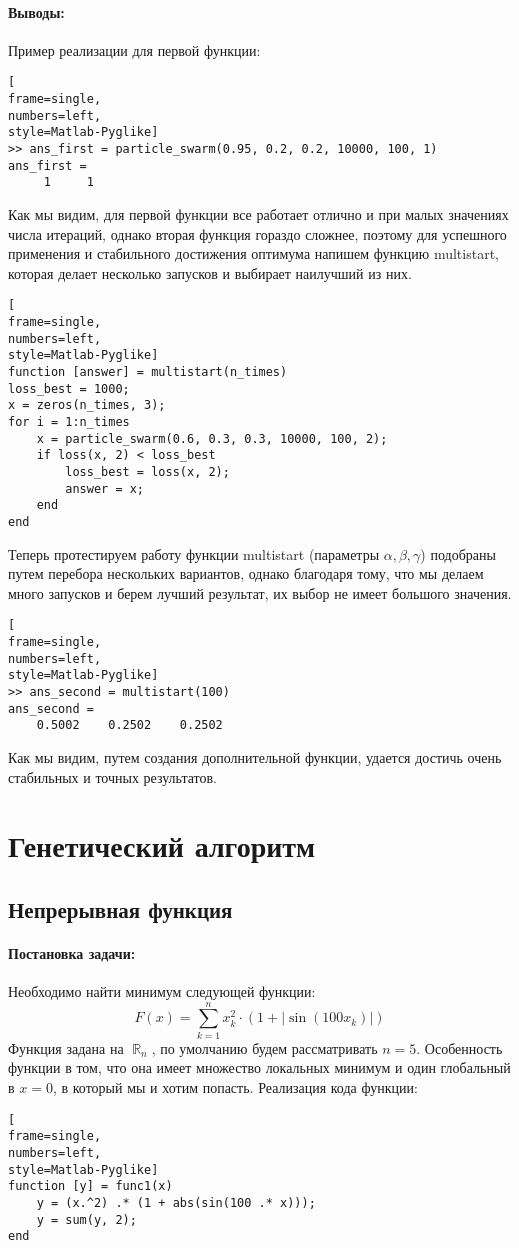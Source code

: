 \documentclass[12pt]{article}
\DeclareMathOperator{\R}{\mathbb{R}}
\begin{document}
\paragraph{Выводы:}
Пример реализации для первой функции:
\begin{lstlisting}[
frame=single,
numbers=left,
style=Matlab-Pyglike]
>> ans_first = particle_swarm(0.95, 0.2, 0.2, 10000, 100, 1)
ans_first =
     1     1
\end{lstlisting}
Как мы видим, для первой функции все работает отлично и при малых значениях числа итераций, однако вторая функция гораздо сложнее, поэтому для успешного применения и стабильного достижения оптимума напишем функцию multistart, которая делает несколько запусков и выбирает наилучший из них. 
\begin{lstlisting}[
frame=single,
numbers=left,
style=Matlab-Pyglike]
function [answer] = multistart(n_times)
loss_best = 1000;
x = zeros(n_times, 3);
for i = 1:n_times
    x = particle_swarm(0.6, 0.3, 0.3, 10000, 100, 2);
    if loss(x, 2) < loss_best
        loss_best = loss(x, 2);
        answer = x;
    end
end
\end{lstlisting}
Теперь протестируем работу функции multistart (параметры $\alpha, \beta, \gamma$) подобраны путем перебора нескольких вариантов, однако благодаря тому, что мы делаем много запусков и берем лучший результат, их выбор не имеет большого значения. 
\begin{lstlisting}[
frame=single,
numbers=left,
style=Matlab-Pyglike]
>> ans_second = multistart(100)
ans_second =
    0.5002    0.2502    0.2502
\end{lstlisting}
Как мы видим, путем создания дополнительной функции, удается достичь очень стабильных и точных результатов. 
\section{Генетический алгоритм}
\subsection{Непрерывная функция}
\paragraph{Постановка задачи:} Необходимо найти минимум следующей функции:
$$
F(x) = \sum_{k=1}^n x_k^2 \cdot (1 + |\sin(100 x_k)|)
$$
Функция задана на $\R_n$, по умолчанию будем рассматривать $n = 5$. Особенность функции в том, что она имеет множество локальных минимум и один глобальный в $x = 0$, в который мы и хотим попасть. Реализация кода функции:
\begin{lstlisting}[
frame=single,
numbers=left,
style=Matlab-Pyglike]
function [y] = func1(x)
    y = (x.^2) .* (1 + abs(sin(100 .* x)));
    y = sum(y, 2);
end
\end{lstlisting}
\end{document}
